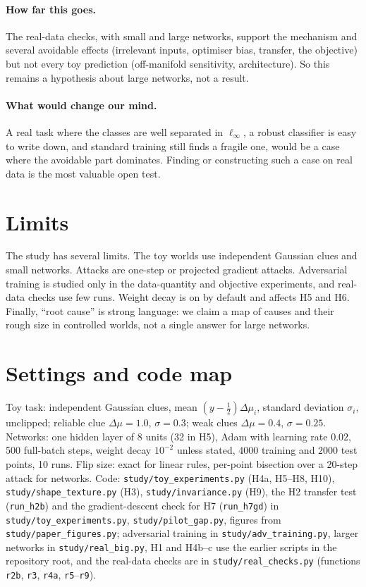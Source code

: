 \documentclass[11pt]{article}
\begin{document}
\paragraph{How far this goes.} The real-data checks, with small and large networks, support the mechanism and several avoidable effects (irrelevant inputs, optimiser bias, transfer, the objective) but not every toy prediction (off-manifold sensitivity, architecture). So this remains a hypothesis about large networks, not a result.

\paragraph{What would change our mind.} A real task where the classes are well separated in $\ell_\infty$, a robust classifier is easy to write down, and standard training still finds a fragile one, would be a case where the avoidable part dominates. Finding or constructing such a case on real data is the most valuable open test.

\section{Limits}

The study has several limits. The toy worlds use independent Gaussian clues and small networks. Attacks are one-step or projected gradient attacks. Adversarial training is studied only in the data-quantity and objective experiments, and real-data checks use few runs. Weight decay is on by default and affects H5 and H6. Finally, ``root cause'' is strong language: we claim a map of causes and their rough size in controlled worlds, not a single answer for large networks.

\appendix
\section{Settings and code map}
\label{app:settings}

Toy task: independent Gaussian clues, mean $(y-\tfrac12)\Delta\mu_i$, standard deviation $\sigma_i$, unclipped; reliable clue $\Delta\mu=1.0$, $\sigma=0.3$; weak clues $\Delta\mu=0.4$, $\sigma=0.25$. Networks: one hidden layer of 8 units (32 in H5), Adam with learning rate $0.02$, 500 full-batch steps, weight decay $10^{-2}$ unless stated, $4000$ training and $2000$ test points, 10 runs. Flip size: exact for linear rules, per-point bisection over a 20-step attack for networks. Code: \texttt{study/toy\_experiments.py} (H4a, H5--H8, H10), \texttt{study/shape\_texture.py} (H3), \texttt{study/invariance.py} (H9), the H2 transfer test (\texttt{run\_h2b}) and the gradient-descent check for H7 (\texttt{run\_h7gd}) in \texttt{study/toy\_experiments.py}, \texttt{study/pilot\_gap.py}, figures from \texttt{study/paper\_figures.py}; adversarial training in \texttt{study/adv\_training.py}, larger networks in \texttt{study/real\_big.py}, H1 and H4b--c use the earlier scripts in the repository root, and the real-data checks are in \texttt{study/real\_checks.py} (functions \texttt{r2b}, \texttt{r3}, \texttt{r4a}, \texttt{r5}--\texttt{r9}).
\end{document}
